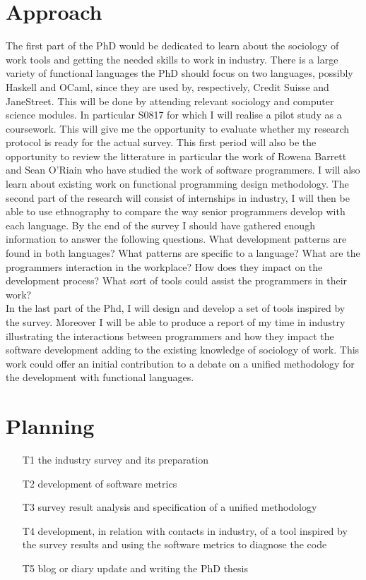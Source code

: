 \documentclass[12p]{article}
\begin{document}
\section*{Approach}
The first part of the PhD would be dedicated to learn about the
sociology of work tools and getting the needed skills to work in
industry. There is a large variety of functional languages the PhD
should focus on two languages, possibly Haskell and OCaml, since they
are used by, respectively, Credit Suisse and JaneStreet. This will be
done by attending relevant sociology and computer science modules. In
particular S0817 for which I will realise a pilot study as a
coursework. This will give me the opportunity to evaluate whether my
research protocol is ready for the actual survey. This first period
will also be the opportunity to review the litterature in particular
the work of Rowena Barrett and Sean O'Riain who have studied the work
of software programmers. I will also learn about existing work on
functional programming design methodology. The second part of the
research will consist of internships in industry, I will then be able
to use ethnography to compare the way senior programmers develop with
each language. By the end of the survey I should have gathered enough
information to answer the following questions. What development
patterns are found in both languages? What patterns are specific to a
language? What are the programmers interaction in the workplace? How
does they impact on the development process? What sort of tools could
assist the programmers in their work?\\

In the last part of the Phd, I will design and develop a set of tools
inspired by the survey. Moreover I will be able to produce a report of
my time in industry illustrating the interactions between programmers
and how they impact the software development adding to the existing
knowledge of sociology of work. This work could offer an initial
contribution to a debate on a unified methodology for the development
with functional languages.





\section*{Planning}

\begin{itemize}
\item[T1] the industry survey and its preparation
\item[T2] development of software metrics
\item[T3] survey result analysis and specification of a unified
  methodology
\item[T4] development, in relation with contacts in industry, of
  a tool inspired by the survey results and using the software metrics
  to diagnose the code
\item[T5] blog or diary update and writing the PhD thesis
\end{itemize}
\end{document}
